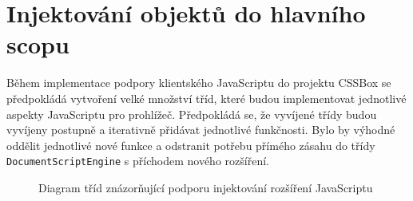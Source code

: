 \section{Injektování objektů do hlavního scopu}
\label{Chapter.Design.GlobalScopeInjections}

Během implementace podpory klientského JavaScriptu do projektu CSSBox se předpokládá vytvoření velké množství tříd, které budou implementovat jednotlivé aspekty JavaScriptu pro prohlížeč. Předpokládá se, že vyvíjené třídy budou vyvíjeny postupně a iterativně přidávat jednotlivé funkčnosti. Bylo by výhodné oddělit jednotlivé nové funkce a odstranit potřebu přímého zásahu do třídy \texttt{DocumentScriptEngine} s příchodem nového rozšíření. 

\begin{figure}[H]
  \begin{center}
    \caption{Diagram tříd znázorňující podporu injektování rozšíření JavaScriptu}
    \label{Figure.GlobalScopeInjectionsDesign}
  \end{center}
\end{figure}

